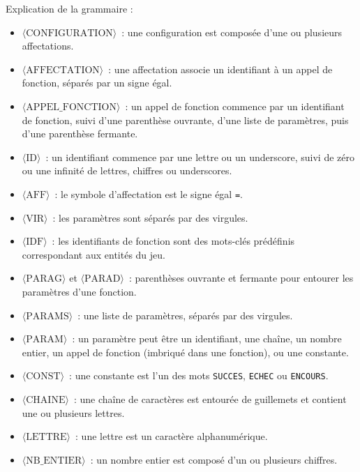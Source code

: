 \documentclass[a4paper, 12pt]{report}
\begin{document}
\noindent
Explication de la grammaire :
\begin{itemize}
	\item \textbf{$\langle \text{CONFIGURATION} \rangle$}~: une configuration est composée d'une ou plusieurs affectations.
	\item \textbf{$\langle \text{AFFECTATION} \rangle$}~: une affectation associe un identifiant à un appel de fonction, séparés par un signe égal.
	\item \textbf{$\langle \text{APPEL\_FONCTION} \rangle$}~: un appel de fonction commence par un identifiant de fonction, suivi d'une parenthèse ouvrante, d'une liste de paramètres, puis d'une parenthèse fermante.
	\item \textbf{$\langle \text{ID} \rangle$}~: un identifiant commence par une lettre ou un underscore, suivi de zéro ou une infinité de lettres, chiffres ou underscores.
	\item \textbf{$\langle \text{AFF} \rangle$}~: le symbole d'affectation est le signe égal \texttt{=}.
	\item \textbf{$\langle \text{VIR} \rangle$}~: les paramètres sont séparés par des virgules.
	\item \textbf{$\langle \text{IDF} \rangle$}~: les identifiants de fonction sont des mots-clés prédéfinis correspondant aux entités du jeu.
	\item \textbf{$\langle \text{PARAG} \rangle$} et \textbf{$\langle \text{PARAD} \rangle$}~: parenthèses ouvrante et fermante pour entourer les paramètres d'une fonction.
	\item \textbf{$\langle \text{PARAMS} \rangle$}~: une liste de paramètres, séparés par des virgules.
	\item \textbf{$\langle \text{PARAM} \rangle$}~: un paramètre peut être un identifiant, une chaîne, un nombre entier, un appel de fonction (imbriqué dans une fonction), ou une constante.
	\item \textbf{$\langle \text{CONST} \rangle$}~: une constante est l'un des mots \texttt{SUCCES}, \texttt{ECHEC} ou \texttt{ENCOURS}.
	\item \textbf{$\langle \text{CHAINE} \rangle$}~: une chaîne de caractères est entourée de guillemets et contient une ou plusieurs lettres.
	\item \textbf{$\langle \text{LETTRE} \rangle$}~: une lettre est un caractère alphanumérique.
	\item \textbf{$\langle \text{NB\_ENTIER} \rangle$}~: un nombre entier est composé d'un ou plusieurs chiffres.
\end{itemize}
\end{document}
